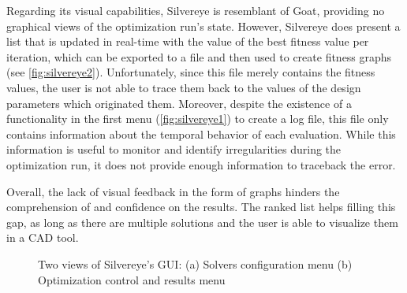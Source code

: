 	Regarding its visual capabilities, Silvereye is resemblant of Goat, providing no graphical views of the optimization run's state. However, Silvereye does present a list that is updated in real-time with the value of the best fitness value per iteration, which can be exported to a file and then used to create fitness graphs (see \cref{fig:silvereye2}). Unfortunately, since this file merely contains the fitness values, the user is not able to trace them back to the values of the design parameters which originated them. Moreover, despite the existence of a functionality in the first menu (\cref{fig:silvereye1}) to create a log file, this file only contains information about the temporal behavior of each evaluation. While this information is useful to monitor and identify irregularities during the optimization run, it does not provide enough information to traceback the error. 
	
	Overall, the lack of visual feedback in the form of graphs hinders the comprehension of and confidence on the results. The ranked list helps filling this gap, as long as there are multiple solutions and the user is able to visualize them in a \ac{CAD} tool.
	
	\begin{figure}[htbp]
		\centering
		\hfill
		
		\caption[Silvereye GUI]{Two views of Silvereye's \ac{GUI}: (a) Solvers configuration menu (b) Optimization control and results menu}
		\label{fig:silvereye}
	\end{figure}
	
